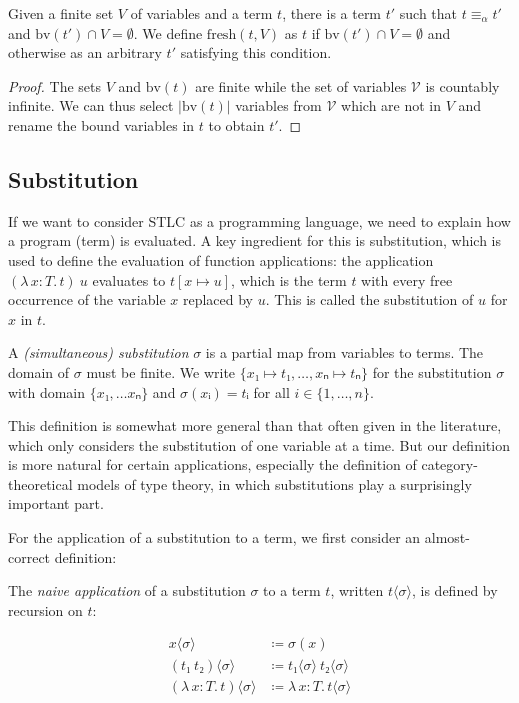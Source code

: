 \documentclass{scrartcl}
\theoremstyle{definition}
\newcommand{\Vars}{\mathcal{V}}
\newcommand{\bv}{\mathrm{bv}}
\newcommand{\fresh}{\mathrm{fresh}}
\newcommand{\Lam}[2]{λ\,#1.\, #2}
\begin{document}
\begin{lemma}\label{lem:fresh-terms}
  Given a finite set $V$ of variables and a term $t$, there is a term $t'$ such that $t ≡_{α} t'$ and $\bv(t') ∩ V = ∅$.
  We define $\fresh(t, V)$ as $t$ if $\bv(t') ∩ V = ∅$ and otherwise as an arbitrary $t'$ satisfying this condition.
\end{lemma}

\begin{proof}
  The sets $V$ and $\bv(t)$ are finite while the set of variables $\Vars$ is countably infinite.
  We can thus select $|\bv(t)|$ variables from $\Vars$ which are not in $V$ and rename the bound variables in $t$ to obtain $t'$.
\end{proof}

\subsection{Substitution}

If we want to consider STLC as a programming language, we need to explain how a program (term) is evaluated.
A key ingredient for this is substitution, which is used to define the evaluation of function applications:
the application $(\Lam{x : T}{t})~u$ evaluates to $t[x ↦ u]$, which is the term $t$ with every free occurrence of the variable $x$ replaced by $u$.
This is called the substitution of $u$ for $x$ in $t$.

\begin{definition}[Substitution]
  A \emph{(simultaneous) substitution} $σ$ is a partial map from variables to terms.
  The domain of $σ$ must be finite.
  We write $\{x₁ ↦ t₁, \dots, xₙ ↦ tₙ\}$ for the substitution $σ$ with domain $\{x₁, \dots xₙ\}$ and $σ(xᵢ) = tᵢ$ for all $i ∈ \{1, \dots, n\}$.
\end{definition}

This definition is somewhat more general than that often given in the literature, which only considers the substitution of one variable at a time.
But our definition is more natural for certain applications, especially the definition of category-theoretical models of type theory, in which substitutions play a surprisingly important part.

For the application of a substitution to a term, we first consider an almost-correct definition:

\begin{definition}
  The \emph{naive application} of a substitution $σ$ to a term $t$, written $t⟨σ⟩$, is defined by recursion on $t$:

  \begin{align*}
    x⟨σ⟩ &\coloneqq σ(x) \\
    (t₁~t₂)⟨σ⟩ &≔ t₁⟨σ⟩~t₂⟨σ⟩ \\
    (\Lam{x : T}{t})⟨σ⟩ &≔ \Lam{x : T}{t⟨σ⟩}
  \end{align*}
\end{definition}
\end{document}
